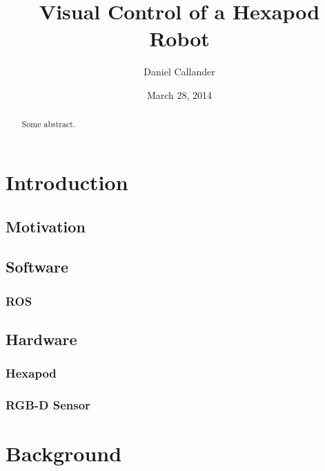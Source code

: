 \documentclass{l4proj}
\begin{document}


\title{Visual Control of a Hexapod Robot}
\author{Daniel Callander}
\date{March 28, 2014}
\maketitle

\begin{abstract}
Some abstract.
\end{abstract}

\educationalconsent
\tableofcontents


\chapter{Introduction}

\section{Motivation}
\section{Software}
\subsection{ROS}

\section{Hardware}
\subsection{Hexapod}
\subsection{RGB-D Sensor}


\chapter{Background}
\end{document}
